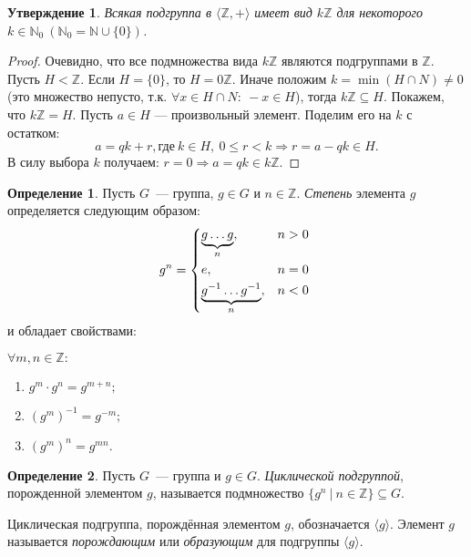 \documentclass[a4paper, 14pt]{extarticle}
\newcommand{\n}{\par}
\newcommand{\integers}{\mathbb{Z}}
\newcommand{\naturals}{\mathbb{N}}
\theoremstyle{definition}
\newtheorem{definition}{Определение}
\theoremstyle{plain}
\numberwithin{theorem}{section}
\numberwithin{definition}{section}
\newtheorem*{statement*}{Утверждение}
\numberwithin{statement}{section}
\numberwithin{lemma}{section}
\numberwithin{consequence}{section}
\begin{document}
		\begin{statement*}
			Всякая подгруппа в ${}\langle\integers, +\rangle$ имеет вид $k\integers$ для некоторого ${k \in \naturals_0 \ (\mathbb{N}_0 = \mathbb{N} \cup \{0\})}$.
		\end{statement*}
		\begin{proof}
			Очевидно, что все подмножества вида $k\mathbb{Z}$ являются подгруппами в $\integers$.
			Пусть ${H < \integers}$. Если ${H = \{0\}}$, то ${H = 0\integers}$.
			Иначе положим ${k = \min(H \cap N) \neq 0}$ (это множество непусто, т.к. ${\forall x \in H \cap N{:} ~-x \in H}$), тогда ${k\integers \subseteq H}$.
			Покажем, что ${k\integers = H}$. Пусть ${a \in H}$ — произвольный элемент. Поделим его на $k$ с остатком:
			\begin{equation*}
				a = qk + r, \text{где} \ k \in H, \  
				0 \leqslant r < k \Rightarrow r = a - qk \in H.
			\end{equation*}
			В силу выбора $k$ получаем: ${r = 0 \Rightarrow a = qk \in k\integers}$.
		\end{proof}
		\begin{definition}
			Пусть $G$~--- группа, $g \in G$ и $n \in \integers$. \textit{Степень} элемента $g$ определяется следующим образом:
			\begin{equation*}
				g^{n}=
				\begin{cases*}
					\underbrace{g \mathellipsis g}_n,  &$n > 0$ \\
					e,  &$n = 0$ \\
					\underbrace{g^{-1} \mathellipsis g^{-1}}_n, &$n < 0$
				\end{cases*}
			\end{equation*}
			и обладает свойствами:\n
			$\forall m, n \in \integers:$
			\begin{enumerate}
				\setlength\itemsep{0.1em}
				\item $g^m \cdot g^n = g^{m+n};$
				\item $(g^m)^{-1} = g^{-m};$
				\item $(g^m)^n = g^{mn}.$
			\end{enumerate}
		\end{definition}
		\newpage
		\begin{definition}
			Пусть $G$~--- группа и $g \in G$. \textit{Циклической подгруппой}, порожденной элементом $g$, называется подмножество ${\{g^n \ | \ n \in \integers\} \subseteq G}$. \n
			Циклическая подгруппа, порождённая элементом $g$, обозначается $\langle g \rangle$. Элемент $g$ называется \textit{порождающим} или \textit{образующим} для подгруппы $\langle g \rangle$.
		\end{definition}
\end{document}
